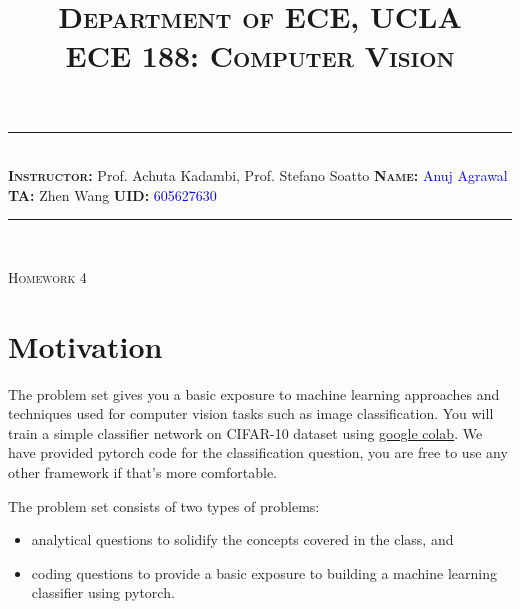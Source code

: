 \documentclass[answers]{exam}
\title{\normalfont \normalsize
\textsc{{Department of ECE, UCLA \\
ECE 188: Computer Vision}}
\date{\vspace{-12ex}}
}
\newcommand{\myinput}[1]{\textcolor{blue}{#1}}
\begin{document}
\maketitle
\rule{\linewidth}{0.8pt} \\[6pt] 
\noindent
\large\textbf{\textsc{Instructor:}} Prof. Achuta Kadambi, Prof. Stefano Soatto \hfill \large\textbf{\textsc{Name:}} \myinput{Anuj Agrawal}\\
\large\textbf{\textsc{TA:}} Zhen Wang \hfill 
\large\textbf{\textsc{UID:}} \myinput{605627630}
\rule{\linewidth}{0.8pt} \\[6pt] 

\begin{center}
{\textsc{Homework 4}} 
\end{center}


\begin{table}[h]
\centering
{}
\caption*{}
\label{}
\end{table}
\section*{Motivation}
The problem set gives you a basic exposure to machine learning approaches and techniques used for computer vision tasks such as image classification. You will train a simple classifier network on CIFAR-10 dataset using \href{https://colab.research.google.com/notebooks/intro.ipynb#recent=true}{google colab}. We have provided pytorch code for the classification question, you are free to use any other framework if that's more comfortable.  

The problem set consists of two types of problems: 
\begin{itemize}
    \item analytical questions to solidify the concepts covered in the class, and
    \item coding questions to provide a basic exposure to building a machine learning classifier using pytorch.
\end{itemize}
\end{document}
